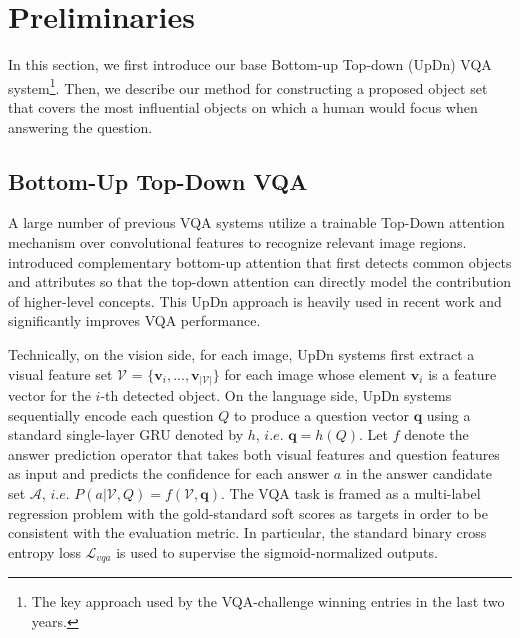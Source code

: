 \documentclass{article}
\begin{document}
\section{Preliminaries}
In this section, we first introduce our base Bottom-up Top-down (UpDn) VQA system\footnote{The key approach used by the VQA-challenge winning entries in the last two years.}\cite{anderson2017bottom}.  Then, we describe our method for constructing a proposed object set that covers the most influential objects on which a human would focus when answering the question.

\subsection{Bottom-Up Top-Down VQA}
A large number of previous VQA systems \cite{fukui2016multimodal,ben2017mutan,ramakrishnan2018overcoming} utilize a trainable Top-Down attention mechanism over convolutional features to recognize relevant image regions. \cite{anderson2017bottom} introduced complementary bottom-up attention that first detects common objects and attributes so that the top-down attention can directly model the contribution of higher-level concepts. This UpDn approach is heavily used in recent work \cite{selvaraju2019taking,wu2018faithful,jiang2018pythia,xie2019visual,shah2019cycle} and significantly improves VQA performance.

Technically, on the vision side, for each image, UpDn systems first extract a visual feature set $\mathcal{V}$ = $\{\textbf{v}_i, ..., \textbf{v}_{|\mathcal{V}|}\}$ for each image whose element $\textbf{v}_i$ is a feature vector for the $i$-th detected object. On the language side, UpDn systems sequentially encode each question $Q$ to produce a question vector $\textbf{q}$ using a standard single-layer GRU \cite{cho2014learning} denoted by $h$, $i.e.$ $\textbf{q} = h(Q)$. Let $f$ denote the answer prediction operator that takes both visual features and question features as input and predicts the confidence for each answer $a$ in the answer candidate set $\mathcal{A}$, $i.e.$  $P(a|\mathcal{V}, Q) = f(\mathcal{V}, \textbf{q})$. The VQA task is framed as a multi-label regression problem with the gold-standard soft scores as targets in order to be consistent with the evaluation metric. In particular, the standard binary cross entropy loss $\mathcal{L}_{vqa}$ is used to supervise the sigmoid-normalized outputs.
\end{document}
